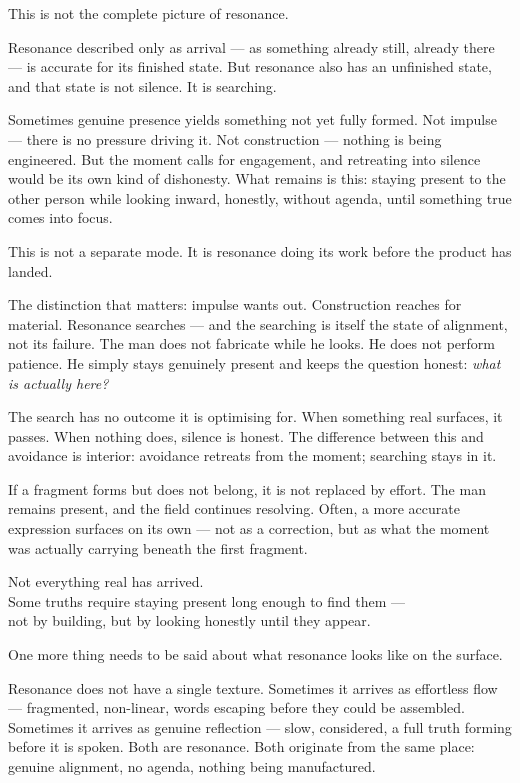 This is not the complete picture of resonance.

Resonance described only as arrival --- as something already still, already there --- is accurate for its finished state. But resonance also has an unfinished state, and that state is not silence. It is searching.

Sometimes genuine presence yields something not yet fully formed. Not impulse --- there is no pressure driving it. Not construction --- nothing is being engineered. But the moment calls for engagement, and retreating into silence would be its own kind of dishonesty. What remains is this: staying present to the other person while looking inward, honestly, without agenda, until something true comes into focus.

This is not a separate mode. It is resonance doing its work before the product has landed.

The distinction that matters: impulse wants out. Construction reaches for material. Resonance searches --- and the searching is itself the state of alignment, not its failure. The man does not fabricate while he looks. He does not perform patience. He simply stays genuinely present and keeps the question honest: \textit{what is actually here?}

The search has no outcome it is optimising for. When something real surfaces, it passes. When nothing does, silence is honest. The difference between this and avoidance is interior: avoidance retreats from the moment; searching stays in it.

If a fragment forms but does not belong, it is not replaced by effort. The man remains present, and the field continues resolving. Often, a more accurate expression surfaces on its own — not as a correction, but as what the moment was actually carrying beneath the first fragment.
\begin{calloutbox}

Not everything real has arrived.\\

Some truths require staying present long enough to find them ---\\

not by building, but by looking honestly until they appear.

\end{calloutbox}

One more thing needs to be said about what resonance looks like on the surface.

Resonance does not have a single texture. Sometimes it arrives as effortless flow --- fragmented, non-linear, words escaping before they could be assembled. Sometimes it arrives as genuine reflection --- slow, considered, a full truth forming before it is spoken. Both are resonance. Both originate from the same place: genuine alignment, no agenda, nothing being manufactured.

